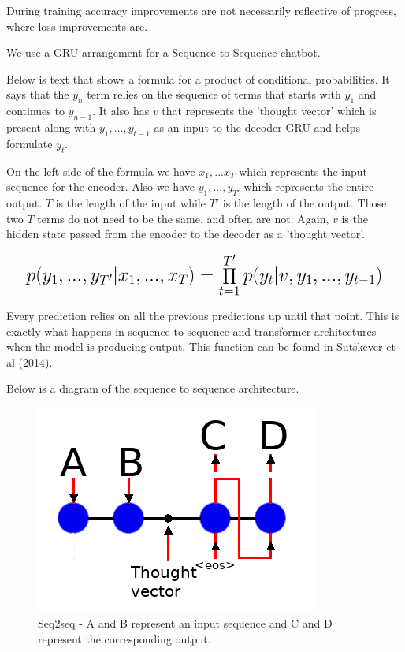 During training accuracy improvements are not necessarily reflective of progress, where loss
improvements are.

We use a GRU arrangement for a Sequence to Sequence chatbot.

Below is text that shows a formula for a product of conditional probabilities. It says that the $y_n$ term relies on the sequence of terms that starts with $y_1$ and continues to $y_{n-1}$. It also has $v$ that represents the 'thought vector' which is present along with $y_1,...,y_{t-1}$ as an input to the decoder GRU and helps formulate $y_t$.

On the left side of the formula we have $x_1,...x_T$ which represents the input sequence for the encoder. Also we have $y_1,...,y_{T'}$ which represents the entire output. $T$ is the length of the input while $T'$ is the length of the output. Those two $T$ terms do not need to be the same, and often are not. Again, $v$ is the hidden state passed from the encoder to the decoder as a 'thought vector'.

\[
\mathlarger{ \mathlarger{ \mathlarger{
		p(y_1,...,y_{T'}|x_1,...,x_T) = \prod_{t=1}^{T'} p(y_t|v,y_1,..., y_{t-1}) 
} } }
\]

Every prediction relies on all the previous predictions up until that point. This is exactly what happens in sequence to sequence and transformer architectures when the model is producing output. This function can be found in Sutskever et al (2014)\cite{DBLP:journals/corr/SutskeverVL14}.

Below is a diagram of the sequence to sequence architecture.

\begin{figure}[H]

\begin{center}

\includegraphics[scale=0.5]{diagram-nmt}

	
\end{center}

\caption[Sequence to Sequence]{Seq2seq - A and B represent an input sequence and C and D represent the corresponding output.}

\end{figure}



